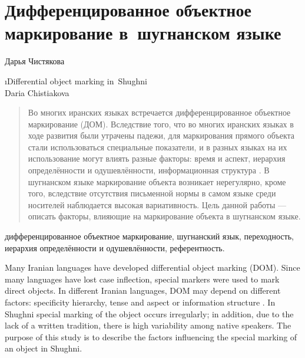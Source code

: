 ﻿\chapter*{Дифференцированное объектное маркирование в~шугнанском языке}
\setcounter{section}{0}
\label{chapter-chist-dom}

\begin{customauthorname}
Дарья Чистякова
\end{customauthorname}

\begin{englishtitle}
\i{Differential object marking in~Shughni\\{\small Daria Chistiakova}}
\end{englishtitle}

\begin{abstract}
Во многих иранских языках встречается дифференцированное объектное маркирование (ДОМ). Вследствие того, что во многих иранских языках в ходе развития были утрачены падежи, для маркирования прямого объекта стали использоваться специальные показатели, и в разных языках на их использование могут влиять разные факторы: время и аспект, иерархия определённости и одушевлённости, информационная структура \parencites[33]{windfuhr2009}{bossong1985}. В шугнанском языке маркирование объекта возникает нерегулярно, кроме того, вследствие отсутствия письменной нормы в самом языке среди носителей наблюдается высокая вариативность. Цель данной работы — описать факторы, влияющие на маркирование объекта в шугнанском языке.
\end{abstract}

\begin{keywords}
дифференцированное объектное маркирование, шугнанский язык, переходность, иерархия определённости и одушевлённости, референтность.
\end{keywords}

\begin{eng-abstract}
Many Iranian languages have developed differential object marking (DOM). Since many languages have lost case inflection, special markers were used to mark direct objects. In different Iranian languages, DOM may depend on different factors: specificity hierarchy, tense and aspect or information structure \parencites[33]{windfuhr2009}{bossong1985}. In Shughni special marking of the object occurs irregularly; in addition, due to the lack of a written tradition, there is high variability among native speakers. The purpose of this study is to describe the factors influencing the special marking of an object in Shughni.
\end{eng-abstract}

